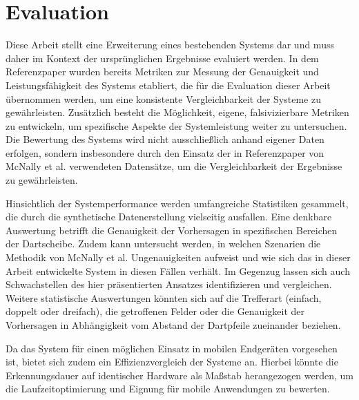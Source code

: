 \section{Evaluation}
\label{sec:evaluation}

Diese Arbeit stellt eine Erweiterung eines bestehenden Systems dar und muss daher im Kontext der ursprünglichen Ergebnisse evaluiert werden. In dem Referenzpaper wurden bereits Metriken zur Messung der Genauigkeit und Leistungsfähigkeit des Systems etabliert, die für die Evaluation dieser Arbeit übernommen werden, um eine konsistente Vergleichbarkeit der Systeme zu gewährleisten. Zusätzlich besteht die Möglichkeit, eigene, falsivizierbare Metriken zu entwickeln, um spezifische Aspekte der Systemleistung weiter zu untersuchen. Die Bewertung des Systems wird nicht ausschließlich anhand eigener Daten erfolgen, sondern insbesondere durch den Einsatz der in Referenzpaper von McNally et al. verwendeten Datensätze, um die Vergleichbarkeit der Ergebnisse zu gewährleisten.

Hinsichtlich der Systemperformance werden umfangreiche Statistiken gesammelt, die durch die synthetische Datenerstellung vielseitig ausfallen. Eine denkbare Auswertung betrifft die Genauigkeit der Vorhersagen in spezifischen Bereichen der Dartscheibe. Zudem kann untersucht werden, in welchen Szenarien die Methodik von McNally et al. Ungenauigkeiten aufweist und wie sich das in dieser Arbeit entwickelte System in diesen Fällen verhält. Im Gegenzug lassen sich auch Schwachstellen des hier präsentierten Ansatzes identifizieren und vergleichen. Weitere statistische Auswertungen könnten sich auf die Trefferart (einfach, doppelt oder dreifach), die getroffenen Felder oder die Genauigkeit der Vorhersagen in Abhängigkeit vom Abstand der Dartpfeile zueinander beziehen.

Da das System für einen möglichen Einsatz in mobilen Endgeräten vorgesehen ist, bietet sich zudem ein Effizienzvergleich der Systeme an. Hierbei könnte die Erkennungsdauer auf identischer Hardware als Maßstab herangezogen werden, um die Laufzeitoptimierung und Eignung für mobile Anwendungen zu bewerten.

